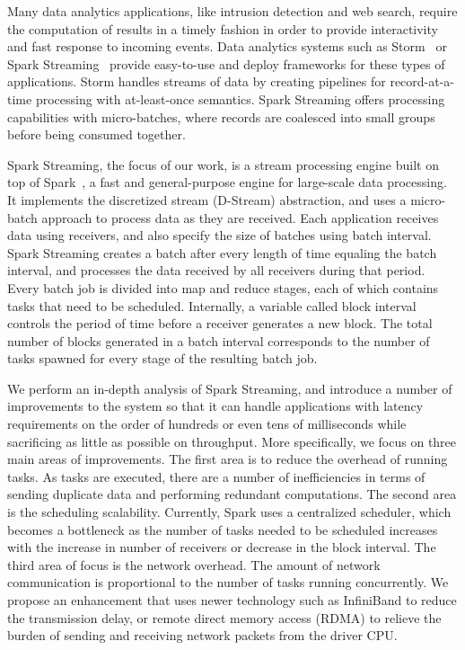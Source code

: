 \noindent

Many data analytics applications, like intrusion detection and web search, 
require the computation of results in a timely fashion in order to provide interactivity and fast response to incoming events.
Data analytics systems such as Storm~\cite{Storm} or Spark Streaming~\cite{SparkStreaming} provide easy-to-use and deploy frameworks for these types of applications. 
Storm handles streams of data by creating pipelines for record-at-a-time processing with at-least-once semantics. 
Spark Streaming offers processing capabilities with micro-batches, where records are coalesced into small groups before being consumed together.

%
%
Spark Streaming, the focus of our work, is a stream processing engine built on top of Spark~\cite{Spark}, a fast and general-purpose engine for large-scale data processing. It implements the discretized stream (D-Stream) abstraction, and uses a micro-batch approach to process data as they are received. Each application receives data using receivers, and also specify the size of batches using batch interval. Spark Streaming creates a batch after every length of time equaling the batch interval, and processes the data received by all receivers during that period. Every batch job is divided into map and reduce stages, each of which contains tasks that need to be scheduled. Internally, a variable called block interval controls the period of time before a receiver generates a new block. The total number of blocks generated in a batch interval corresponds to the number of tasks spawned for every stage of the resulting batch job.

We perform an in-depth analysis of Spark Streaming, and introduce a number of improvements to the system so that it can handle applications with latency requirements on the order of hundreds or even tens of milliseconds while sacrificing as little as possible on throughput. More specifically, we focus on three main areas of improvements. The first area is to reduce the overhead of running tasks. As tasks are executed, there are a number of inefficiencies in terms of sending duplicate data and performing redundant computations. The second area is the scheduling scalability. Currently, Spark uses a centralized scheduler, which becomes a bottleneck as the number of tasks needed to be scheduled increases with the increase in number of receivers or decrease in the block interval. The third area of focus is the network overhead. The amount of network communication is proportional to the number of tasks running concurrently. We propose an enhancement that uses newer technology such as InfiniBand to reduce the transmission delay, or remote direct memory access (RDMA) to relieve the burden of sending and receiving network packets from the driver CPU.

